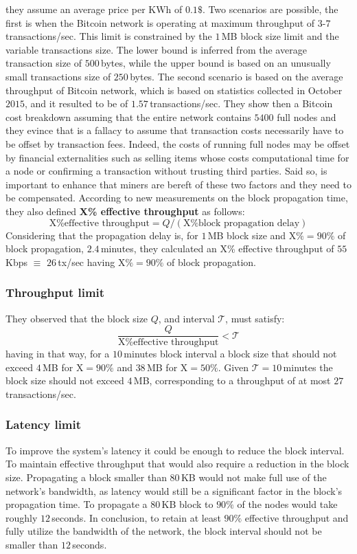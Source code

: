 they assume an average price per KWh of $0.1\$$. Two scenarios are
possible, the first is when the Bitcoin network is operating at
maximum throughput of $3$-$7$\,transactions/sec. This
limit is constrained by the $1$\,MB block size limit and the
variable transactions size. The lower bound is inferred
from the average transaction size of $500$\,bytes, while the
upper bound is based on an unusually small transactions
size of $250$\,bytes. The second scenario is based on the
average throughput of Bitcoin network, which is based on
statistics collected in October $2015$, and it resulted to be
of $1.57$\,transactions/sec. They show then a Bitcoin cost
breakdown assuming that the entire network contains
$5400$ full nodes and they evince that is a fallacy to assume
that transaction costs necessarily have to be offset by
transaction fees. Indeed, the costs of running full nodes
may be offset by financial externalities such as selling items
whose costs computational time for a node or confirming a
transaction without trusting third parties. Said so, is important
to enhance that miners are bereft of these two factors and
they need to be compensated. According to new measurements
on the block propagation time, they also defined \textbf{X\% effective
throughput} as follows:
\[
\text{X\% effective throughput} = Q / (\text{X\% block propagation delay})
\]
Considering that the propagation delay is, for $1$\,MB block size and
$\text{X}\% = 90\%$ of block propagation, $2.4$\,minutes, they calculated
an X\% effective throughput of $55$\,Kbps $\equiv$ $26$\,tx/sec
having  $\text{X}\% = 90\%$ of block propagation.
\subsubsection{Throughput limit}
They observed that the block size $Q$, and interval $\mathcal{T}$,
must satisfy:
\[
\frac{Q}{\text{X\% effective throughput}} < \mathcal{T}
\]
having in that way, for a $10$\,minutes block interval a block size
that should not exceed $4$\,MB for $\text{X}=90\%$ and $38$\,MB for
$\text{X}=50\%$. Given $\mathcal{T} = 10$\,minutes the block size
should not exceed $4$\,MB, corresponding to a throughput
of at most $27$\,transactions/sec.
\subsubsection{Latency limit}
To improve the system's latency it could be enough
to reduce the block interval. To maintain effective
throughput that would also require a reduction in the
block size. Propagating a block smaller than $80$\,KB would
not make full use of the network's bandwidth, as latency would
still be a significant factor in the block's propagation time.
To propagate a $80$\,KB block to $90\%$ of the nodes would
take roughly $12$\,seconds. In conclusion, to retain at least $90\%$
effective throughput and fully utilize the bandwidth of the network,
the block interval should not be smaller than $12$\,seconds.

